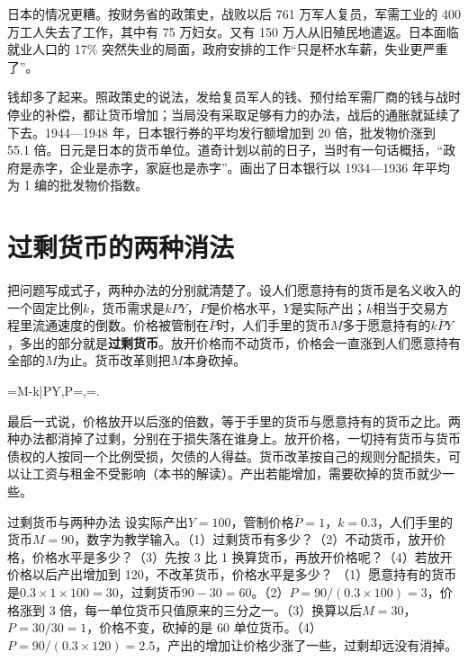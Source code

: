 日本的情况更糟。按财务省的政策史，战败以后 761 万军人复员，军需工业的 400 万工人失去了工作，其中有 75 万妇女\cite{mof2010}。又有 150 万人从旧殖民地遣返\cite{mof2010}。日本面临就业人口的 17\% 突然失业的局面，政府安排的工作“只是杯水车薪，失业更严重了”\cite{mof2010}。

钱却多了起来。照政策史的说法，发给复员军人的钱、预付给军需厂商的钱与战时停业的补偿，都让货币增加；当局没有采取足够有力的办法，战后的通胀就延续了下去\cite{mof2010}。1944—1948 年，日本银行券的平均发行额增加到 20 倍，批发物价涨到 55.1 倍\cite{mof2010}。日元是日本的货币单位。道奇计划以前的日子，当时有一句话概括，“政府是赤字，企业是赤字，家庭也是赤字”\cite{mof2010}。画出了日本银行以 1934—1936 年平均为 1 编的批发物价指数\cite{bojwpi}。


\section{过剩货币的两种消法}\label{sec:reconstruction-overhang}

把问题写成式子，两种办法的分别就清楚了。设人们愿意持有的货币是名义收入的一个固定比例$k$，货币需求是$kPY$，$P$是价格水平，$Y$是实际产出；$k$相当于交易方程里流通速度的倒数。价格被管制在$\bar P$时，人们手里的货币$M$多于愿意持有的$k\bar PY$，多出的部分就是\textbf{过剩货币}。放开价格而不动货币，价格会一直涨到人们愿意持有全部的$M$为止。货币改革则把$M$本身砍掉。
\begin{keyeq}
=M-k\bar PY,\qquad {}\;P=,\qquad {}=.\label{eq:reconstruction-overhang}
\end{keyeq}
最后一式说，价格放开以后涨的倍数，等于手里的货币与愿意持有的货币之比。两种办法都消掉了过剩，分别在于损失落在谁身上。放开价格，一切持有货币与货币债权的人按同一个比例受损，欠债的人得益。货币改革按自己的规则分配损失，可以让工资与租金不受影响（本书的解读）。产出若能增加，需要砍掉的货币就少一些。

\begin{example}{过剩货币与两种办法}\label{ex:reconstruction-overhang}
设实际产出$Y=100$，管制价格$\bar P=1$，$k=0.3$，人们手里的货币$M=90$，数字为教学输入。（1）过剩货币有多少？（2）不动货币，放开价格，价格水平是多少？（3）先按 3 比 1 换算货币，再放开价格呢？（4）若放开价格以后产出增加到 120，不改革货币，价格水平是多少？
\solution
（1）愿意持有的货币是$0.3\times1\times100=30$，过剩货币$90-30=60$。（2）$P=90/(0.3\times100)=3$，价格涨到 3 倍，每一单位货币只值原来的三分之一。（3）换算以后$M=30$，$P=30/30=1$，价格不变，砍掉的是 60 单位货币。（4）$P=90/(0.3\times120)=2.5$，产出的增加让价格少涨了一些，过剩却远没有消掉。
\end{example}

